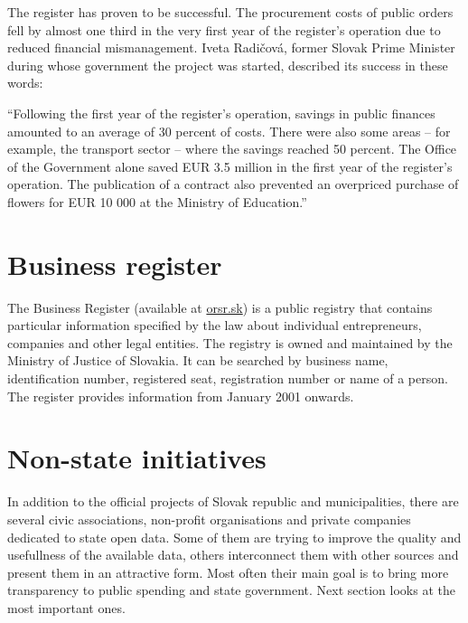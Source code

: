 \documentclass[thesis=B,english]{FITthesis}[2012/06/26]
\begin{document}
    	The register has proven to be successful. The procurement costs of public orders fell by almost one third in the very first year of the register’s operation due to reduced financial mismanagement. Iveta Radičová, former Slovak Prime Minister during whose government the project was started, described its success in these words:
\begin{displayquote}“Following the first year of the register’s operation, savings in public finances amounted to an average of 30 percent of costs. There were also some areas – for example, the transport sector – where the savings reached 50 percent. The Office of the Government alone saved EUR 3.5 million in the first year of the register’s operation. The publication of a contract also prevented an overpriced purchase of flowers for EUR 10 000 at the Ministry of Education.”\cite{joinupcrz}
\end{displayquote}
    \section{Business register}
    \label{businessregister}
     The Business Register (available at \href{http://www.orsr.sk}{orsr.sk}) is a public registry that contains particular information specified by the law about individual entrepreneurs, companies and other legal entities. The registry is owned and maintained by the Ministry of Justice of Slovakia. It can be searched by business name, identification number, registered seat, registration number or name of a person. The register provides information from January 2001 onwards.

	\section{Non-state initiatives}
	\label{non-state-initiatives}
	In addition to the official projects of Slovak republic and municipalities, there are several civic associations, non-profit organisations and private companies dedicated to state open data. Some of them are trying to improve the quality and usefullness of the available data, others interconnect them with other sources and present them in an attractive form. Most often their main goal is to bring more transparency to public spending and state government. Next section looks at the most important ones.
\end{document}
